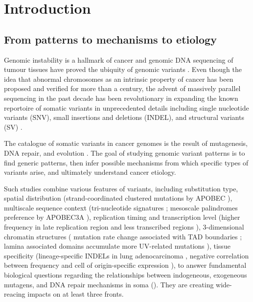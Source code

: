 \documentclass[phd,tocprelim]{cornell}
\begin{document}

\chapter{Introduction}

\section{From patterns to mechanisms to etiology}
Genomic instability is a hallmark of cancer \cite{Hanahan2011-ni} and genomic DNA sequencing of tumour tissues have proved the ubiquity of genomic variants \cite{pcawg_marker2020-yi}. Even though the idea that abnormal chromosomes as an intrinsic property of cancer has been proposed \cite{Boveri2008-rl} and verified for more than a century, the advent of massively parallel sequencing in the past decade has been revolutionary in expanding the known reportoire of somatic variants in unprecedented details including single nucleotide variants (SNV), small insertions and deletions (INDEL), and structural variants (SV) \cite{Meyerson2010-xc}. 

The catalogue of somatic variants in cancer genomes is the result of mutagenesis, DNA repair, and evolution \cite{Stratton2009-ty}. The goal of studying genomic variant patterns is to find generic patterns, then infer possible mechanisms from which specific types of variants arise, and ultimately understand cancer etiology.

Such studies combine various features of variants, including substitution type, spatial distribution (strand-coordinated clustered mutations by APOBEC \cite{Shi2017-cd}), multiscale sequence context (tri-nucleotide signatures \cite{alexandrov2013}; mesoscale palindromes preference by APOBEC3A \cite{Buisson2019-ue}), replication timing and transcription level (higher frequency in late replication region and less transcribed regions \cite{Lawrence2013-zx}), 3-dimensional chromatin structures ( mutation rate change associated with TAD boundaries \cite{Akdemir2020-hn}; lamina associated domains accumulate more UV-related mutations \cite{Garcia-Nieto2017-ox}), tissue specificity (lineage-specific INDELs in lung adenocarcinoma \cite{imielinski2017}, negative correlation between frequency and cell of origin-specific expression \cite{polak2015}), to answer fundamental biological questions regarding the relationships between indogeneous, exogeneous mutagens, and DNA repair mechanisms in soma (\cite{Zou2021-je,Volkova2020-zg,Vohringer2021-bv}). They are creating wide-reacing impacts on at least three fronts.
\end{document}
